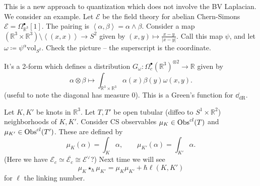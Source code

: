This is a new approach to quantization which does not involve the BV Laplacian. We consider an example. Let $\mathcal{E} $ be the field theory for abelian Chern-Simons $\mathcal{E} =\Omega ^{\bullet} _{\mathbb{R} ^3}[1] $. The pairing is $\left\langle \alpha ,\beta  \right\rangle =\alpha \wedge \beta $. Consider a map $(\mathbb{R} ^3\times \mathbb{R} ^3)\setminus \left\langle (x,x) \right\rangle \to S^2$ given by $(x,y)\mapsto \frac{x-y}{\left| x-y \right| } $. Call this map $\psi $, and let $\omega \coloneqq \psi ^\alpha \mathrm{vol} _{S^2} $. Check the picture -- the superscript is the coordinate.

It's a 2-form which defines a distribution $G_\omega : \Omega _c^{\bullet} (\mathbb{R} ^3)^{\otimes 2} \to \mathbb{R} $ given by
\[
	\alpha \otimes \beta \mapsto \int_{\mathbb{R} ^3\times \mathbb{R} ^3} \alpha (x)\beta (y)\omega (x,y)
.\]
(useful to note the diagonal has measure 0). This is a Green's function for $\dd _{\mathrm{dR} } $.

Let $K,K'$ be knots in $\mathbb{R} ^3$. Let $T,T'$ be open tubular (diffeo to $S^1\times \mathbb{R} ^2$) neighborhoods of $K,K'$. Consider CS observables $\mu _K\in\operatorname{Obs}^{cl} (T)$ and $\mu _{K'} \in\operatorname{Obs}^{cl} (T')$. These are defined by
\[
	\mu _K(\alpha )=\int_{K} \alpha ,\qquad \mu _{K'} (\alpha )=\int_{K'} \alpha 
.\]
(Here we have $\mathcal{E} _c \simeq \overline{\mathcal{E} _c} \cong \mathcal{E}^\vee $?) Next time we will see
\[
	\mu _K \star _\hbar \mu _{K'} =\mu _K\mu _{K'} +\hbar \ell (K,K')
\]
for $\ell $ the linking number.
